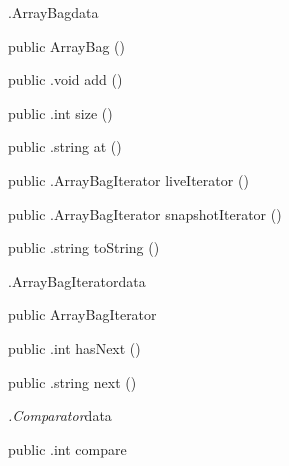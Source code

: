 \begin{CrexxClass}{.ArrayBag}{data}

  \begin{Hierarchy}
  \end{Hierarchy}

  \begin{Members}

    \Factory
      {public}
      {ArrayBag}
      {()}

    \Method
      {public}
      {.void}
      {add}
      {()}

    \Method
      {public}
      {.int}
      {size}
      {()}

    \Method
      {public}
      {.string}
      {at}
      {()}

    \Method
      {public}
      {.ArrayBagIterator}
      {liveIterator}
      {()}

    \Method
      {public}
      {.ArrayBagIterator}
      {snapshotIterator}
      {()}

    \Method
      {public}
      {.string}
      {toString}
      {()}

  \end{Members}
\end{CrexxClass}

\begin{CrexxClass}{.ArrayBagIterator}{data}

  \begin{Hierarchy}
  \end{Hierarchy}

  \begin{Members}

    \Factory
      {public}
      {ArrayBagIterator}
      {}

    \Method
      {public}
      {.int}
      {hasNext}
      {()}

    \Method
      {public}
      {.string}
      {next}
      {()}

  \end{Members}
\end{CrexxClass}

\begin{CrexxClass}{\textit{.Comparator}}{data}

  \begin{Hierarchy}
  \end{Hierarchy}

  \begin{Members}

    \Method
      {public}
      {.int}
      {compare}
      {}

  \end{Members}
\end{CrexxClass}

